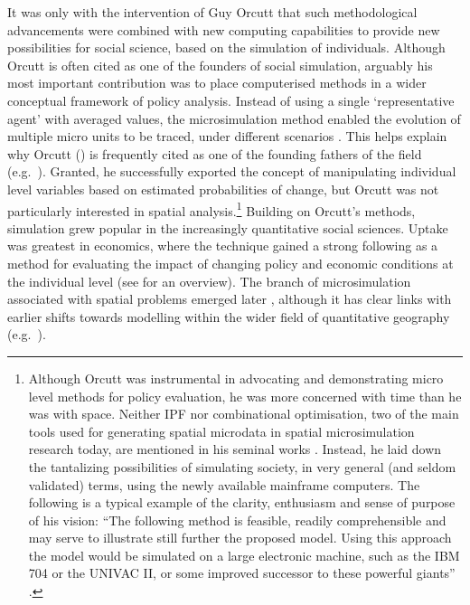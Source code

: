 \documentclass[a4paper, 11pt, twoside]{Thesis}
\begin{document}
It was only with the intervention of Guy Orcutt that such methodological
advancements were combined with new computing capabilities to provide new
possibilities for social science, based on the simulation of individuals.
Although Orcutt is often cited as one of the founders of social simulation,
arguably his most important contribution was to place computerised methods in a
wider conceptual framework of policy analysis. Instead of using a
single `representative agent' with averaged values, the microsimulation method
enabled the evolution of multiple micro units to be traced, under different
scenarios \citep[p.~176]{mitton2000microsimulation}.
This helps explain why Orcutt (\citeyear{Orcutt1957-new-type,
orcutt1961microanalysis}) is frequently cited as one of the founding fathers of
the field
(e.g.~\citealp{Clarke+Longley1989-UK-housing-sim,Wu2008,
Ballas2013-4policy-analysis}). Granted, he successfully exported the concept of
manipulating individual level variables based on estimated
probabilities of change, but Orcutt was not particularly interested in
spatial analysis.\footnote{Although
Orcutt was instrumental in advocating and demonstrating
micro level methods for policy evaluation, he was more concerned with time than
he was with
space. 
Neither IPF nor combinational optimisation, two of the main tools used for
generating spatial microdata in spatial microsimulation research today,
are mentioned in his seminal works
\citep{Orcutt1957-new-type,orcutt1961microanalysis}.
Instead, he laid down the tantalizing possibilities of simulating society, in
very general (and seldom validated) terms, using the newly available
mainframe computers. The following is a typical example of the clarity,
enthusiasm and sense of purpose of his vision: ``The following method is
feasible, readily comprehensible and may serve to illustrate still further the
proposed model. Using this approach the model would be simulated on a large
electronic machine, such as the IBM 704 or the UNIVAC II, or some improved
successor to these powerful giants'' \citep[p.~119]{Orcutt1957-new-type}.
}
Building on Orcutt's methods, simulation grew popular in the
increasingly quantitative social sciences. Uptake was
greatest in economics, where the technique
gained a strong following as a method for evaluating the impact of
changing policy and economic conditions at the individual level
(see \citealp{Merz1994} for an overview).
The branch of microsimulation associated with spatial problems emerged later
\citep{Tanton2013-intro}, although it has clear links with earlier shifts
towards modelling within the wider field of quantitative geography
(e.g.~\citealp{Clarke1985}).
\end{document}
